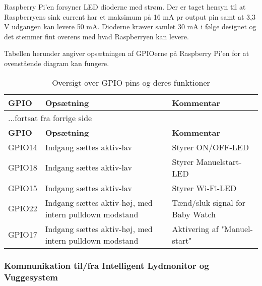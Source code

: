 
Raspberry Pi'en forsyner LED dioderne med strøm. Der er taget hensyn til at Raspberryens sink current har et maksimum på 16 mA pr output pin samt at 3,3 V udgangen kan levere 50 mA. Dioderne kræver samlet 30 mA i følge designet og det stemmer fint overens med hvad Raspberryen kan levere. 

Tabellen herunder angiver opsætningen af GPIOerne på Raspberry Pi'en for at ovenstående diagram kan fungere.

\begin{center}
\label{ctrl:raspberry_pi_setup}
\begin{longtable}{|p{3cm}|p{4cm}|p{4cm}|}
\caption{Oversigt over GPIO pins og deres funktioner}\\
\hline
\textbf{GPIO}	&\textbf{Opsætning} 		&\textbf{Kommentar} 	\\ \hline
\endfirsthead
\multicolumn{3}{l}{...fortsat fra forrige side} \\ \hline 
\textbf{GPIO}	&\textbf{Opsætning} 		&\textbf{Kommentar}  \\ \hline
\endhead



GPIO14
&Indgang sættes aktiv-lav
&Styrer ON/OFF-LED

\\\hline

GPIO18
&Indgang sættes aktiv-lav
&Styrer Manuelstart-LED

\\\hline


GPIO15
&Indgang sættes aktiv-lav
&Styrer Wi-Fi-LED

\\\hline

GPIO22
&Indgang sættes aktiv-høj, med intern pulldown modstand
&Tænd/sluk signal for Baby Watch

\\\hline

GPIO17
&Indgang sættes aktiv-høj, med intern pulldown modstand
&Aktivering af "Manuel-start"
\\\hline

\end{longtable}
\end{center}

\subsubsection*{Kommunikation til/fra Intelligent Lydmonitor og Vuggesystem}

